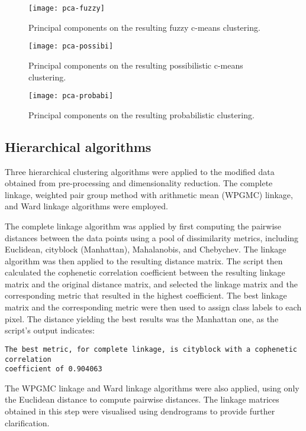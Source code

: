 \documentclass[
  course = {{DS12E Clustering Algorithms}},
  quartile = {{2}},
  assignment = ,
  name = {{Michael Darmanis ; Vasilios Venieris}},
  studentnumber = {{7115152200004 ; 7115152200017}},
  email = {{mdarm@di.uoa.gr ; vvenieris@di.uoa.gr}},
  firstexercise = 1
]{aga-homework}
\begin{document}
\begin{figure}[htbp!]
	\centering
    \texttt{[image: pca-fuzzy]}
    \caption{Principal components on the resulting fuzzy c-means clustering.}
    \label{fig:fuzzy}
\end{figure}

\begin{figure}[htbp!]
	\centering
    \texttt{[image: pca-possibi]}
    \caption{Principal components on the resulting possibilistic c-means clustering.}
    \label{fig:possibi}
\end{figure}

\begin{figure}[htbp!]
	\centering
    \texttt{[image: pca-probabi]}
    \caption{Principal components on the resulting probabilistic clustering.}
    \label{fig:probabi}
\end{figure}


\FloatBarrier
\subsection{Hierarchical algorithms}

Three hierarchical clustering algorithms were applied to the modified data obtained from pre-processing and dimensionality reduction. The complete linkage, weighted pair group method with arithmetic mean (WPGMC) linkage, and Ward linkage algorithms were employed.

The complete linkage algorithm was applied by first computing the pairwise distances between the data points using a pool of dissimilarity metrics, including Euclidean, cityblock (Manhattan), Mahalanobis, and Chebychev. The linkage algorithm was then applied to the resulting distance matrix. The script then calculated the cophenetic correlation coefficient between the resulting linkage matrix and the original distance matrix, and selected the linkage matrix and the corresponding metric that resulted in the highest coefficient. The best linkage matrix and the corresponding metric were then used to assign class labels to each pixel. The distance yielding the best results was the Manhattan one, as the script's output indicates:

\begin{verbatim}
The best metric, for complete linkage, is cityblock with a cophenetic correlation
coefficient of 0.904063
\end{verbatim}

The WPGMC linkage and Ward linkage algorithms were also applied, using only the Euclidean distance to compute pairwise distances. The linkage matrices obtained in this step were visualised using dendrograms to provide further clarification.
\end{document}
